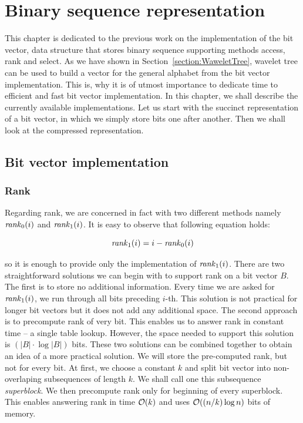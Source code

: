\chapter{Binary sequence representation}
\label{kap:kap2}

This chapter is dedicated to the previous work on the implementation of the bit vector, data
structure that stores binary sequence supporting methods access, rank and select. As we have
shown in Section~\ref{section:WaweletTree}, wavelet tree can be used to build a vector
for the general alphabet from the bit vector implementation. This is, why it is of utmost
importance to dedicate time to efficient and fast bit vector implementation. In this
chapter, we shall describe the currently available implementations. Let us start with
the succinct representation of a bit vector, in which we simply store bits one after another.
Then we shall look at the compressed representation.

\section{Bit vector implementation}

\subsection{Rank}
\label{section:rank}

Regarding rank, we are concerned in fact with two different methods namely $\mathit{rank}_0(i)$ and
$\mathit{rank}_1(i)$. It is easy to observe that following equation holds:

                    $$\mathit{rank}_1(i) = i - \mathit{rank}_0(i)$$

so it is enough to provide only the implementation of $\mathit{rank}_1(i)$.
There are two straightforward solutions we can begin with to support rank on a bit vector
$B$. The first is to store no additional information. Every time we are asked
for $\mathit{rank}_1(i)$, we run through all bits preceding $i$-th. This solution is not
practical for longer bit vectors but it does not add any additional space. The second
approach is to precompute rank of very bit. This enables us to answer rank in constant
time -- a single table lookup. However, the space needed to support this
solution is $(|B|\cdot\log |B|)$ bits. These two solutions can be combined together to obtain an
idea of a more practical solution. We will store the pre-computed rank, but not for every
bit. At first, we choose a constant $k$ and split bit vector into non-overlaping subsequences
of length $k$. We shall call one this subsequence \textit{superblock}. We then precompute rank
only for beginning of every superblock. This enables answering rank in time $\mathcal{O}(k)$ and
uses $\mathcal{O}((n/k)\log n)$ bits of memory.

